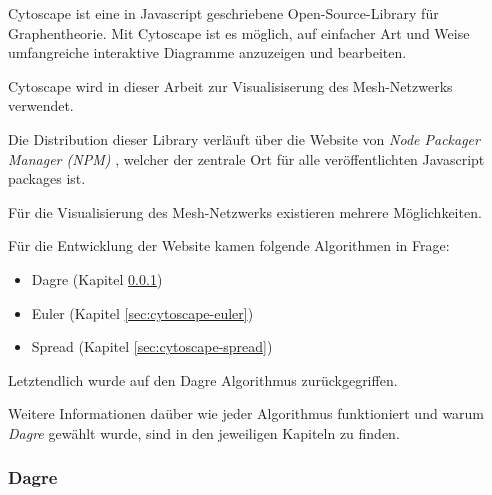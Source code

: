 Cytoscape ist eine in Javascript geschriebene Open-Source-Library für Graphentheorie.
Mit Cytoscape ist es möglich, auf einfacher Art und Weise umfangreiche interaktive Diagramme anzuzeigen und bearbeiten. \cite{cytoscape_intro}

Cytoscape wird in dieser Arbeit zur Visualisiserung des Mesh-Netzwerks verwendet.

Die Distribution dieser Library verläuft über die Website von \textit{Node Packager Manager (NPM)} \cite{npm}, welcher der zentrale Ort für alle veröffentlichten Javascript packages ist.

Für die Visualisierung des Mesh-Netzwerks existieren mehrere Möglichkeiten.

Für die Entwicklung der Website kamen folgende Algorithmen in Frage:

\begin{itemize}
    \item Dagre (Kapitel \ref{sec:cytoscape-dagre})
    \item Euler (Kapitel \ref{sec:cytoscape-euler})
    \item Spread (Kapitel \ref{sec:cytoscape-spread})
\end{itemize}

Letztendlich wurde auf den Dagre Algorithmus zurückgegriffen.

Weitere Informationen daüber wie jeder Algorithmus funktioniert und warum \textit{Dagre} gewählt wurde, sind in den jeweiligen Kapiteln zu finden.

\subsubsection{Dagre}\label{sec:cytoscape-dagre}

